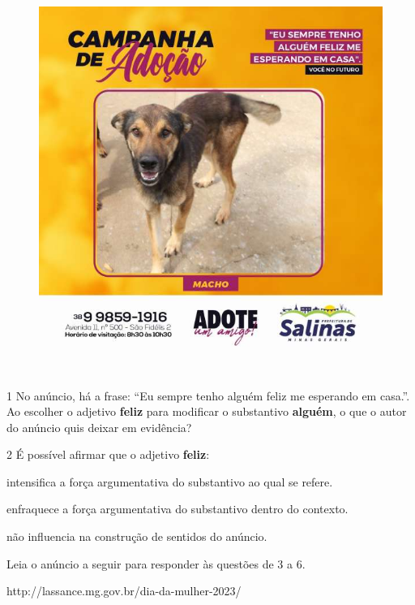 \begin{itemize}
\begin{itemize}
\begin{figure}
\centering
\includegraphics[width=4.96806in,height=4.96806in]{./_SAEB_9_POR/media/image19.jpeg}
\caption{}
\end{figure}

\num{1} No anúncio, há a frase: ``Eu sempre tenho alguém feliz me
esperando em casa.''. Ao escolher o adjetivo \textbf{feliz} para
modificar o substantivo \textbf{alguém}, o que o autor do anúncio quis
deixar em evidência? 

\num{2} É possível afirmar que o adjetivo \textbf{feliz}:

 intensifica a força argumentativa do substantivo ao qual se
refere.

 enfraquece a força argumentativa do substantivo dentro do contexto.

 não influencia na construção de sentidos do anúncio.

Leia o anúncio a seguir para responder às questões de 3 a 6.

http://lassance.mg.gov.br/dia-da-mulher-2023/


\end{itemize}
\end{itemize}
